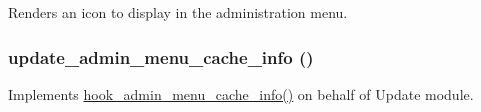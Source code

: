 \label{admin__menu_8inc_ab93751624cbfa203208fba5c90192ee1}
Renders an icon to display in the administration menu. \hypertarget{admin__menu_8inc_a244f8c73c3414cbf1d9ec52f2fd65fbc}{
\subsubsection[{update\_\-admin\_\-menu\_\-cache\_\-info}]{\setlength{\rightskip}{0pt plus 5cm}update\_\-admin\_\-menu\_\-cache\_\-info ()}}
\label{admin__menu_8inc_a244f8c73c3414cbf1d9ec52f2fd65fbc}
Implements \hyperlink{admin__menu_8api_8php_a4458e9bb8dfc9515707b474b9faceca6}{hook\_\-admin\_\-menu\_\-cache\_\-info()} on behalf of Update module. 